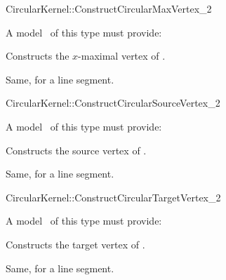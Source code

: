 \begin{ccRefFunctionObjectConcept}{CircularKernel::ConstructCircularMaxVertex_2} 


A model \ccVar\ of this type must provide:

{Constructs the $x$-maximal vertex of .
}

{Same, for a line segment.}

\end{ccRefFunctionObjectConcept}

\begin{ccRefFunctionObjectConcept}{CircularKernel::ConstructCircularSourceVertex_2} 


A model \ccVar\ of this type must provide:

{Constructs the source vertex of .}

{Same, for a line segment.}

\end{ccRefFunctionObjectConcept}

\begin{ccRefFunctionObjectConcept}{CircularKernel::ConstructCircularTargetVertex_2} 


A model \ccVar\ of this type must provide:

{Constructs the target vertex of .}

{Same, for a line segment.}

\end{ccRefFunctionObjectConcept}

